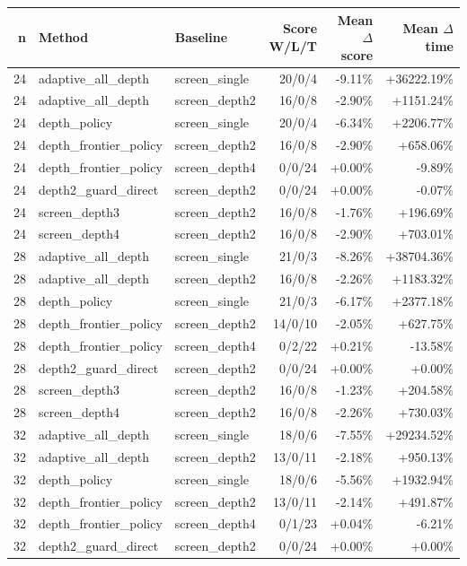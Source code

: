 \begin{tabular}{rllrrr}
\toprule
n & Method & Baseline & Score W/L/T & Mean $\Delta$ score & Mean $\Delta$ time \\
\midrule
24 & adaptive_all_depth & screen_single & 20/0/4 & -9.11\% & +36222.19\% \\
24 & adaptive_all_depth & screen_depth2 & 16/0/8 & -2.90\% & +1151.24\% \\
24 & depth_policy & screen_single & 20/0/4 & -6.34\% & +2206.77\% \\
24 & depth_frontier_policy & screen_depth2 & 16/0/8 & -2.90\% & +658.06\% \\
24 & depth_frontier_policy & screen_depth4 & 0/0/24 & +0.00\% & -9.89\% \\
24 & depth2_guard_direct & screen_depth2 & 0/0/24 & +0.00\% & -0.07\% \\
24 & screen_depth3 & screen_depth2 & 16/0/8 & -1.76\% & +196.69\% \\
24 & screen_depth4 & screen_depth2 & 16/0/8 & -2.90\% & +703.01\% \\
28 & adaptive_all_depth & screen_single & 21/0/3 & -8.26\% & +38704.36\% \\
28 & adaptive_all_depth & screen_depth2 & 16/0/8 & -2.26\% & +1183.32\% \\
28 & depth_policy & screen_single & 21/0/3 & -6.17\% & +2377.18\% \\
28 & depth_frontier_policy & screen_depth2 & 14/0/10 & -2.05\% & +627.75\% \\
28 & depth_frontier_policy & screen_depth4 & 0/2/22 & +0.21\% & -13.58\% \\
28 & depth2_guard_direct & screen_depth2 & 0/0/24 & +0.00\% & +0.00\% \\
28 & screen_depth3 & screen_depth2 & 16/0/8 & -1.23\% & +204.58\% \\
28 & screen_depth4 & screen_depth2 & 16/0/8 & -2.26\% & +730.03\% \\
32 & adaptive_all_depth & screen_single & 18/0/6 & -7.55\% & +29234.52\% \\
32 & adaptive_all_depth & screen_depth2 & 13/0/11 & -2.18\% & +950.13\% \\
32 & depth_policy & screen_single & 18/0/6 & -5.56\% & +1932.94\% \\
32 & depth_frontier_policy & screen_depth2 & 13/0/11 & -2.14\% & +491.87\% \\
32 & depth_frontier_policy & screen_depth4 & 0/1/23 & +0.04\% & -6.21\% \\
32 & depth2_guard_direct & screen_depth2 & 0/0/24 & +0.00\% & +0.00\% \\

\end{tabular}
